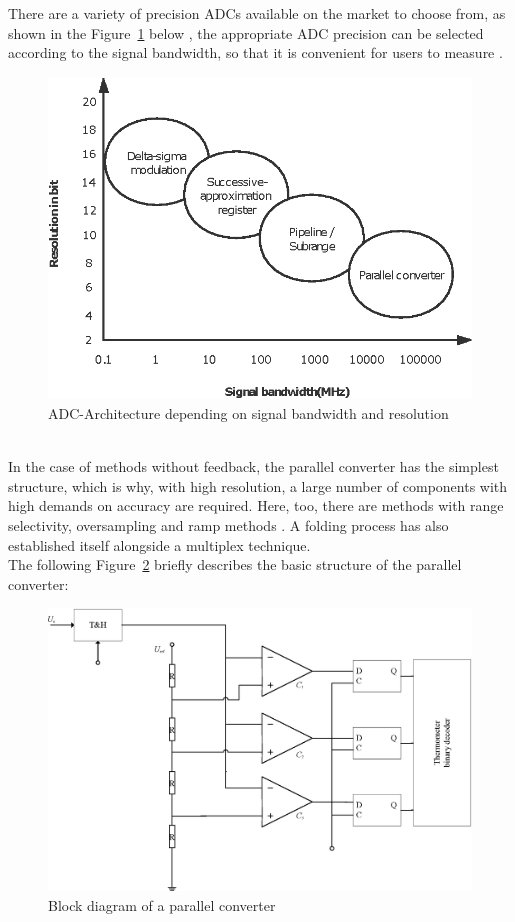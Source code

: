 There are a variety of precision ADCs available on the market to choose from, as shown in the Figure~\ref{fig:2.2} below , the appropriate ADC precision can be selected according to the signal bandwidth, so that it is convenient for users to measure \cite{kester2005adc}.
\begin{figure}[h]
	\centering
	\includegraphics{grafiken/2.2.eps}
	\caption{ADC-Architecture depending on signal bandwidth and resolution} 
	\label{fig:2.2}
\end{figure}
\\
In the case of methods without feedback, the parallel converter has the simplest structure, which is why, with high resolution, a large number of components with high demands on accuracy are required. Here, too, there are methods with range selectivity, oversampling and ramp methods \cite{abumurad2012increasing}. A folding process has also established itself alongside a multiplex technique. 
\\
The following Figure~\ref{fig:2.3} briefly describes the basic structure of the parallel converter:
\begin{figure}[h]
	\centering
	\includegraphics[width=15cm]{grafiken/2.3.eps}
	\caption{Block diagram of a parallel converter} 
	\label{fig:2.3}
\end{figure}
